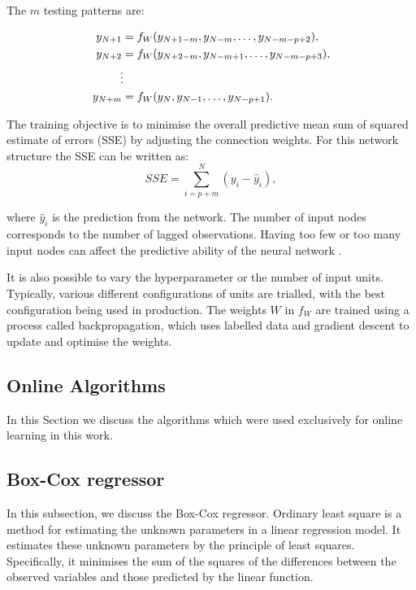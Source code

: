 The $m$ testing patterns are:

\begin{align}
y_{N+1} & =f_{W}(y_{N+1-m}, y_{N-m},\ldots,y_{N-m-p+2}),\\
y_{N+2} & =f_{W}(y_{N+2-m}, y_{N-m+1},\ldots,y_{N-m-p+3}),\\
&\vdotswithin  \notag \\
y_{N+m} & =f_{W}(y_{N},y_{N-1},\ldots,y_{N-p+1}).
\end{align}

The training objective is to minimise the overall predictive mean sum of squared estimate of errors (SSE) by adjusting the connection weights. For this network structure the SSE can be written as:
\begin{equation}
SSE = \sum_{i=p+m}^N(y_i-\hat{y}_i),
\end{equation}

\noindent where $\hat{y}_i$ is the prediction from the network. The number of input nodes corresponds to the number of lagged observations. Having too few or too many input nodes can affect the predictive ability of the neural network \cite{Pao2007}.

It is also possible to vary the hyperparameter or the number of input units. Typically, various different configurations of units are trialled, with the best configuration being used in production. The weights $W$ in $f_W$ are trained using a process called backpropagation\cite{rumelhart1986learning}, which uses labelled data and gradient descent to update and optimise the weights.

\subsection{Online Algorithms}

In this Section we discuss the algorithms which were used exclusively for online learning in this work.

\subsection{Box-Cox regressor}

In this subsection, we discuss the Box-Cox regressor. Ordinary least square is a method for estimating the unknown parameters in a linear regression model. It estimates these unknown parameters by the principle of least squares. Specifically, it minimises the sum of the squares of the differences between the observed variables and those predicted by the linear function.

